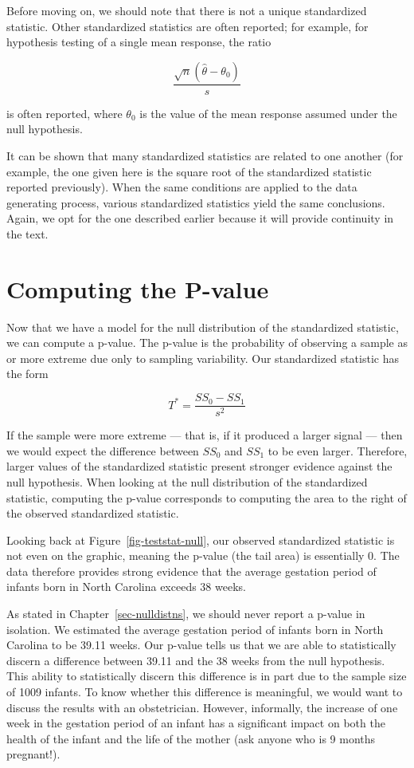 \documentclass[
  letterpaper,
  DIV=11,
  numbers=noendperiod]{scrreprt}
\theoremstyle{plain}
\theoremstyle{definition}
\theoremstyle{definition}
\theoremstyle{remark}
\begin{document}
Before moving on, we should note that there is not a unique standardized
statistic. Other standardized statistics are often reported; for
example, for hypothesis testing of a single mean response, the ratio

\[\frac{\sqrt{n}\left(\widehat{\theta} - \theta_0\right)}{s}\]

is often reported, where \(\theta_0\) is the value of the mean response
assumed under the null hypothesis.

It can be shown that many standardized statistics are related to one
another (for example, the one given here is the square root of the
standardized statistic reported previously). When the same conditions
are applied to the data generating process, various standardized
statistics yield the same conclusions. Again, we opt for the one
described earlier because it will provide continuity in the text.

\section{Computing the P-value}\label{computing-the-p-value}

Now that we have a model for the null distribution of the standardized
statistic, we can compute a p-value. The p-value is the probability of
observing a sample as or more extreme due only to sampling variability.
Our standardized statistic has the form

\[T^* = \frac{SS_0 - SS_1}{s^2}\]

If the sample were more extreme --- that is, if it produced a larger
signal --- then we would expect the difference between \(SS_0\) and
\(SS_1\) to be even larger. Therefore, larger values of the standardized
statistic present stronger evidence against the null hypothesis. When
looking at the null distribution of the standardized statistic,
computing the p-value corresponds to computing the area to the right of
the observed standardized statistic.

Looking back at Figure~\ref{fig-teststat-null}, our observed
standardized statistic is not even on the graphic, meaning the p-value
(the tail area) is essentially 0. The data therefore provides strong
evidence that the average gestation period of infants born in North
Carolina exceeds 38 weeks.

As stated in Chapter~\ref{sec-nulldistns}, we should never report a
p-value in isolation. We estimated the average gestation period of
infants born in North Carolina to be 39.11 weeks. Our p-value tells us
that we are able to statistically discern a difference between 39.11 and
the 38 weeks from the null hypothesis. This ability to statistically
discern this difference is in part due to the sample size of 1009
infants. To know whether this difference is meaningful, we would want to
discuss the results with an obstetrician. However, informally, the
increase of one week in the gestation period of an infant has a
significant impact on both the health of the infant and the life of the
mother (ask anyone who is 9 months pregnant!).
\end{document}

